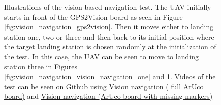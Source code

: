 \documentclass[../Head/report.tex]{subfiles}
\begin{document}
\begin{figure}[H]
\begin{subfigure}[t]{.30\textwidth}
        \caption{}
        \label{fig:vision_navigation_vision_navigation_two}
    \end{subfigure}
    \caption{Illustrations of the vision based navigation test. The UAV initially starts in front of the GPS2Vision board as seen in Figure \ref{fig:vision_navigation_gps2vision}. Then it moves either to landing station one, two or three and then back to its initial position where the target landing station is chosen randomly at the initialization of the test. In this case, the UAV can be seen to move to landing station three in Figures \ref{fig:vision_navigation_vision_navigation_one} and \ref{fig:vision_navigation_vision_navigation_two}. Videos of the test can be seen on Github using \href{https://github.com/Kenil16/master_project/tree/master/test_videos/vision_navigation_full_marker_board_vel_1.0}{Vision navigation ( full ArUco board)} and \href{https://github.com/Kenil16/master_project/tree/master/test_videos/vision_navigation_one_pattern_board_missing_markers_wear_vel_5.0}{Vision navigation (ArUco board with missing markers)}}
    \label{fig:vision_navigation}
\end{figure}
\end{document}
